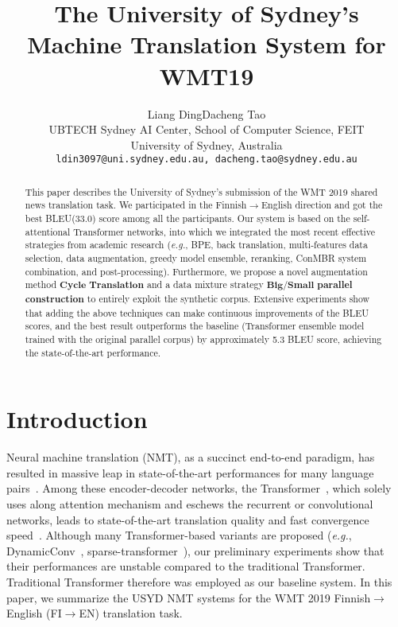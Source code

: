 \documentclass[11pt,a4paper]{article}
\title{The University of Sydney's Machine Translation System for WMT19}
\author{Liang Ding\quad \quad Dacheng Tao\\
  UBTECH Sydney AI Center, School of Computer Science, FEIT\\
  University of Sydney, Australia\\
  {\tt ldin3097@uni.sydney.edu.au, dacheng.tao@sydney.edu.au}
 }
\date{}
\begin{document}
\maketitle
\begin{abstract}
  This paper describes the University of Sydney's submission of the WMT 2019 shared news translation task. 
  We participated in the Finnish$\rightarrow$English direction and got the best BLEU(33.0) score among all the participants. 
  Our system is based on the self-attentional Transformer networks, into which we integrated the most recent effective strategies from academic research (\textit{e.g.}, BPE, back translation, multi-features data selection, data augmentation, greedy model ensemble, reranking, ConMBR system combination, and post-processing). Furthermore, we propose a novel augmentation method $\textbf{Cycle Translation}$ and a data mixture strategy $\bm{Big}$/$\bm{Small}$ \textbf{ parallel construction} to entirely exploit the synthetic corpus. Extensive experiments show that adding the above techniques can make continuous improvements of the BLEU scores, and the best result outperforms the baseline (Transformer ensemble model trained with the original parallel corpus) by approximately 5.3 BLEU score, achieving the state-of-the-art performance.
\end{abstract}

\section{Introduction}
  Neural machine translation (NMT), as a succinct end-to-end paradigm, has resulted in massive leap in state-of-the-art performances for many language pairs~\cite{D13-1176,seq2seq,rnnsearch,convs2s,gnmt,transformer}. Among these encoder-decoder networks, the Transformer~\cite{transformer}, which solely uses along attention mechanism and eschews the recurrent or convolutional networks, leads to state-of-the-art translation quality and fast convergence speed~\cite{ahmed2017weighted}.
  Although many Transformer-based variants are proposed (\textit{e.g.}, DynamicConv~\cite{wu2018pay}, sparse-transformer~\cite{child2019generating}), our preliminary experiments show that their performances are unstable compared to the traditional Transformer. Traditional Transformer therefore was employed as our baseline system. In this paper, we summarize the USYD NMT systems for the WMT 2019 Finnish$\rightarrow$English (FI$\rightarrow$EN) translation task.
 
\end{document}
